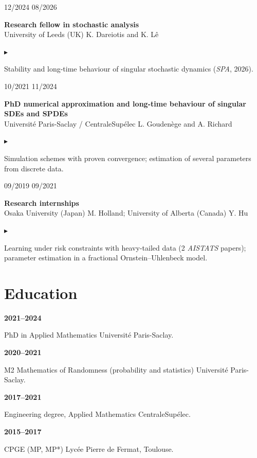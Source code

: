\documentclass[10pt,a4paper]{article}
\newlength{\datecol}\setlength{\datecol}{0.155\textwidth}
\newlength{\gutter}\setlength{\gutter}{0.85em}
\newlength{\bodycol}
\newcommand{\entry}[3]{%
  \par\vspace{0.50ex}\noindent
  \begin{minipage}[t]{\datecol}
    \vspace{0pt}\raggedright\footnotesize\color{muted}#1
  \end{minipage}%
  \hspace{\gutter}%
  \begin{minipage}[t]{\bodycol}
    \vspace{0pt}\raggedright
    {\headingfont\bfseries\footnotesize #2}\\[0.08ex]
    {\footnotesize\color{accent}#3}
  \end{minipage}%
  \par\vspace{0.10ex}
}
\newenvironment{bullets}
  {\begin{list}{\textcolor{accent}{\scriptsize$\blacktriangleright$}}{%
      \setlength{\leftmargin}{\datecol}
      \addtolength{\leftmargin}{\gutter}
      \addtolength{\leftmargin}{1.15em}
      \setlength{\rightmargin}{0pt}
      \setlength{\labelwidth}{0.85em}
      \setlength{\labelsep}{0.3em}
      \setlength{\itemsep}{0.08ex}
      \setlength{\parsep}{0pt}
      \setlength{\topsep}{0.18ex}
      \setlength{\partopsep}{0pt}
      \footnotesize}}
  {\end{list}}
\newcommand{\skillrow}[2]{%
  \par\noindent
  \begin{minipage}[t]{\datecol}
    \vspace{0pt}\raggedright{\headingfont\bfseries\footnotesize #1}
  \end{minipage}%
  \hspace{\gutter}%
  \begin{minipage}[t]{\bodycol}
    \vspace{0pt}\raggedright\footnotesize #2
  \end{minipage}%
  \par\vspace{0.35ex}
}
\begin{document}
\entry{12/2024 \textemdash{} 08/2026}{Research fellow in stochastic analysis}{University of Leeds (UK) \textemdash{} K. Dareiotis and K. Lê}
\begin{bullets}
  \item Stability and long-time behaviour of singular stochastic dynamics (\emph{SPA}, 2026).
\end{bullets}

\entry{10/2021 \textemdash{} 11/2024}{PhD \textemdash{} numerical approximation and long-time behaviour of singular SDEs and SPDEs}{Université Paris-Saclay / CentraleSupélec \textemdash{} L. Goudenège and A. Richard}
\begin{bullets}
  \item Simulation schemes with proven convergence; estimation of several parameters from discrete data.
\end{bullets}

\entry{09/2019 \textemdash{} 09/2021}{Research internships}{Osaka University (Japan) \textemdash{} M. Holland; University of Alberta (Canada) \textemdash{} Y. Hu}
\begin{bullets}
  \item Learning under risk constraints with heavy-tailed data (2 \emph{AISTATS} papers); parameter estimation
  in a fractional Ornstein--Uhlenbeck model.
\end{bullets}

\section{Education}
\skillrow{2021--2024}{PhD in Applied Mathematics \textemdash{} Université Paris-Saclay.}
\skillrow{2020--2021}{M2 Mathematics of Randomness (probability and statistics) \textemdash{} Université Paris-Saclay.}
\skillrow{2017--2021}{Engineering degree, Applied Mathematics \textemdash{} CentraleSupélec.}
\skillrow{2015--2017}{CPGE (MP, MP*) \textemdash{} Lycée Pierre de Fermat, Toulouse.}
\end{document}
